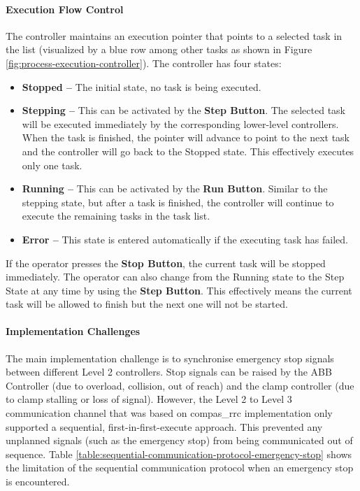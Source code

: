 \paragraph{Execution Flow Control}

The controller maintains an execution pointer that points to a selected task in the list (visualized by a blue row among other tasks as shown in Figure \ref{fig:process-execution-controller}). The controller has four states:

\begin{itemize}
	\item \textbf{Stopped --} The initial state, no task is being executed.

	\item \textbf{Stepping --} This can be activated by the \textbf{Step Button}. The selected task will be executed immediately by the corresponding lower-level controllers. When the task is finished, the pointer will advance to point to the next task and the controller will go back to the Stopped state. This effectively executes only one task.

	\item \textbf{Running --} This can be activated by the \textbf{Run Button}. Similar to the stepping state, but after a task is finished, the controller will continue to execute the remaining tasks in the task list.

	\item \textbf{Error --} This state is entered automatically if the executing task has failed.

\end{itemize}
If the operator presses the \textbf{Stop Button}, the current task will be stopped immediately. The operator can also change from the Running state to the Step State at any time by using the \textbf{Step Button}. This effectively means the current task will be allowed to finish but the next one will not be started.

\paragraph{Implementation Challenges}

The main implementation challenge is to synchronise emergency stop signals between different Level 2 controllers. Stop signals can be raised by the ABB Controller (due to overload, collision, out of reach) and the clamp controller (due to clamp stalling or loss of signal). However, the Level 2 to Level 3 communication channel that was based on compas\_rrc implementation only supported a sequential, first-in-first-execute approach. This prevented any unplanned signals (such as the emergency stop) from being communicated out of sequence. Table \ref{table:sequential-communication-protocol-emergency-stop} shows the limitation of the sequential communication protocol when an emergency stop is encountered.

